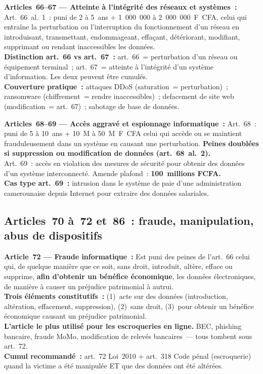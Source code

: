 \begin{boxjuris}
\textbf{Articles~66--67 --- Atteinte à l'intégrité des réseaux et systèmes~:}
Art.~66~al.~1~: puni de 2 à 5~ans + 1~000~000 à 2~000~000~F~CFA, celui
qui entraîne la perturbation ou l'interruption du fonctionnement d'un
réseau en introduisant, transmettant, endommageant, effaçant, détériorant,
modifiant, supprimant ou rendant inaccessibles les données.\\[0.3ex]
\textbf{Distinction art.~66 vs art.~67~:} art.~66~= perturbation d'un réseau
ou équipement terminal~; art.~67~= atteinte à l'intégrité d'un
système d'information. Les deux peuvent être cumulés.\\[0.3ex]
\textbf{Couverture pratique~:} attaques DDoS (saturation~= perturbation)~;
ransomware (chiffrement~= rendre inaccessibles)~; defacement de site web
(modification~= art.~67)~; sabotage de base de données.
\end{boxjuris}

\begin{boxjuris}
\textbf{Articles~68--69 --- Accès aggravé et espionnage informatique~:}
Art.~68~: puni de 5 à 10~ans + 10~M à 50~M~F~CFA celui qui accède ou
se maintient frauduleusement dans un système en causant une perturbation.
\textbf{Peines doublées si suppression ou modification de données
(art.~68~al.~2).}\\[0.3ex]
Art.~69~: accès en violation des mesures de sécurité pour obtenir des
données d'un système interconnecté. Amende plafond~: \textbf{100~millions
FCFA.}\\[0.3ex]
\textbf{Cas type art.~69~:} intrusion dans le système de paie d'une
administration camerounaise depuis Internet pour extraire des données
salariales.
\end{boxjuris}

\subsection{Articles~70 à~72 et~86~: fraude, manipulation, abus de dispositifs}

\begin{boxjuris}
\textbf{Article~72 --- Fraude informatique~:}
Est puni des peines de l'art.~66 celui qui, de quelque manière que ce
soit, sans droit, introduit, altère, efface ou supprime, \textbf{afin
d'obtenir un bénéfice économique}, les données électroniques, de manière
à causer un préjudice patrimonial à autrui.\\[0.3ex]
\textbf{Trois éléments constitutifs~:} (1)~acte sur des données
(introduction, altération, effacement, suppression), (2)~sans droit,
(3)~pour obtenir un bénéfice économique causant un préjudice patrimonial.\\[0.3ex]
\textbf{L'article le plus utilisé pour les escroqueries en ligne.}
BEC, phishing bancaire, fraude MoMo, modification de relevés bancaires~---
tous tombent sous art.~72.\\[0.3ex]
\textbf{Cumul recommandé~:} art.~72 Loi~2010 + art.~318 Code pénal
(escroquerie) quand la victime a été manipulée ET que des données
ont été altérées.
\end{boxjuris}

